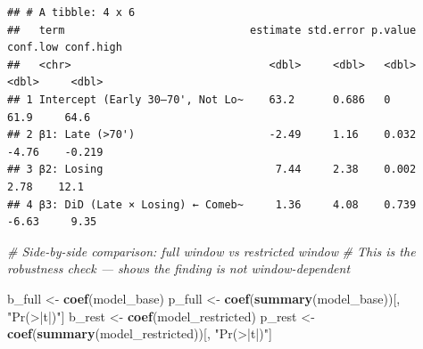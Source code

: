 \documentclass[
]{article}
\newenvironment{Shaded}{\begin{snugshade}}{\end{snugshade}}
\newcommand{\CommentTok}[1]{\textcolor[rgb]{0.56,0.35,0.01}{\textit{#1}}}
\newcommand{\FunctionTok}[1]{\textcolor[rgb]{0.13,0.29,0.53}{\textbf{#1}}}
\newcommand{\NormalTok}[1]{#1}
\newcommand{\OtherTok}[1]{\textcolor[rgb]{0.56,0.35,0.01}{#1}}
\newcommand{\StringTok}[1]{\textcolor[rgb]{0.31,0.60,0.02}{#1}}
\begin{document}
\begin{verbatim}
## # A tibble: 4 x 6
##   term                             estimate std.error p.value conf.low conf.high
##   <chr>                               <dbl>     <dbl>   <dbl>    <dbl>     <dbl>
## 1 Intercept (Early 30–70', Not Lo~    63.2      0.686   0        61.9     64.6  
## 2 β1: Late (>70')                     -2.49     1.16    0.032    -4.76    -0.219
## 3 β2: Losing                           7.44     2.38    0.002     2.78    12.1  
## 4 β3: DiD (Late × Losing) ← Comeb~     1.36     4.08    0.739    -6.63     9.35
\end{verbatim}

\begin{Shaded}
\begin{Highlighting}[]
\CommentTok{\# Side{-}by{-}side comparison: full window vs restricted window}
\CommentTok{\# This is the robustness check — shows the finding is not window{-}dependent}

\NormalTok{b\_full }\OtherTok{\textless{}{-}} \FunctionTok{coef}\NormalTok{(model\_base)}
\NormalTok{p\_full }\OtherTok{\textless{}{-}} \FunctionTok{coef}\NormalTok{(}\FunctionTok{summary}\NormalTok{(model\_base))[, }\StringTok{"Pr(\textgreater{}|t|)"}\NormalTok{]}
\NormalTok{b\_rest }\OtherTok{\textless{}{-}} \FunctionTok{coef}\NormalTok{(model\_restricted)}
\NormalTok{p\_rest }\OtherTok{\textless{}{-}} \FunctionTok{coef}\NormalTok{(}\FunctionTok{summary}\NormalTok{(model\_restricted))[, }\StringTok{"Pr(\textgreater{}|t|)"}\NormalTok{]}


\end{Highlighting}
\end{Shaded}
\end{document}
